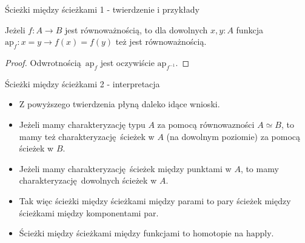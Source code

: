 \documentclass{beamer}
\newcommand{\finv}[1]{#1^{-1}}
\newcommand{\happly}{\text{happly}}
\begin{document}
\begin{frame}{Ścieżki między ścieżkami 1 - twierdzenie i przykłady}

\begin{theorem}
Jeżeli $f : A \to B$ jest równoważnością, to dla dowolnych $x, y : A$ funkcja $\text{ap}_f : x = y \to f(x) = f(y)$ też jest równoważnością.
\end{theorem}

\begin{proof}
Odwrotnością $\text{ap}_f$ jest oczywiście $\text{ap}_{\finv{f}}$.
\end{proof}


\end{frame}

\begin{frame}{Ścieżki między ścieżkami 2 - interpretacja}
\begin{itemize}
	\item Z powyższego twierdzenia płyną daleko idące wnioski.
	\item Jeżeli mamy charakteryzację typu $A$ za pomocą równowazności $A \simeq B$, to mamy też charakteryzację ścieżek w $A$ (na dowolnym poziomie) za pomocą ścieżek w $B$.
	\item Jeżeli mamy charakteryzację ścieżek między punktami w $A$, to mamy charakteryzację dowolnych ścieżek w $A$.
	\item Tak więc ścieżki między ścieżkami między parami to pary ścieżek między ścieżkami między komponentami par.
	\item Ścieżki między ścieżkami między funkcjami to homotopie na $\happly$.
\end{itemize}
\end{frame}
\end{document}
